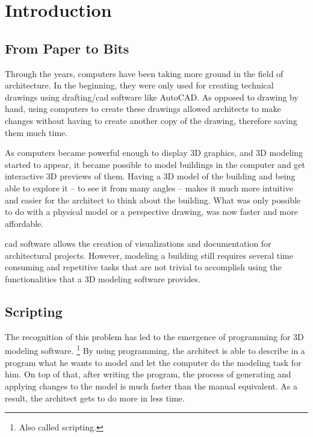 
\chapter{Introduction}
\label{chapter:introduction}


\section{From Paper to Bits}

Through the years, computers have been taking more ground in the field of architecture.
In the beginning, they were only used for creating technical drawings using drafting/\gls{cad} software like AutoCAD.
As opposed to drawing by hand, using computers to create these drawings allowed architects to make changes without having to create another copy of the drawing, therefore saving them much time.

As computers became powerful enough to display 3D graphics, and 3D modeling started to appear, it became possible to model buildings in the computer and get interactive 3D previews of them.
Having a 3D model of the building and being able to explore it -- to see it from many angles -- makes it much more intuitive and easier for the architect to think about the building.
What was only possible to do with a physical model or a perspective drawing, was now faster and more affordable.

\gls{cad} software allows the creation of visualizations and documentation for architectural projects.
However, modeling a building still requires several time consuming and repetitive tasks that are not trivial to accomplish using the functionalities that a 3D modeling software provides.


\section{Scripting}
The recognition of this problem has led to the emergence of programming for 3D modeling software.%
\footnote{Also called scripting.}
By using programming, the architect is able to describe in a program what he wants to model and let the computer do the modeling task for him.
On top of that, after writing the program, the process of generating and applying changes to the model is much faster than the manual equivalent.
As a result, the architect gets to do more in less time.

